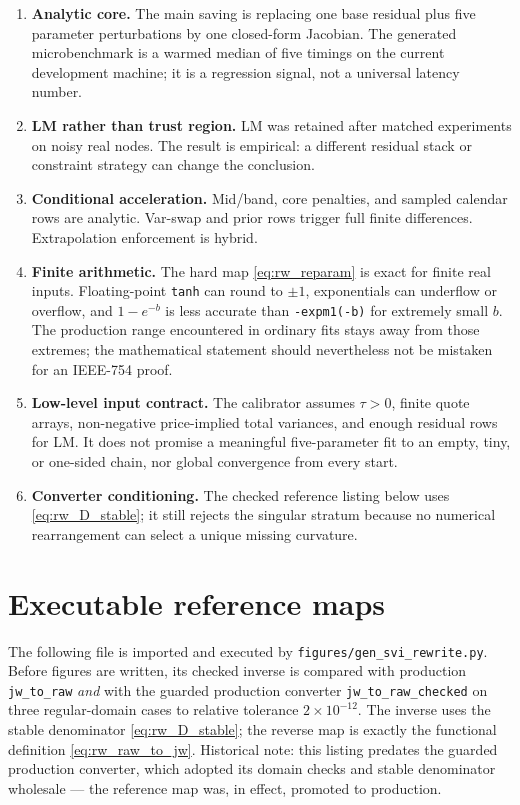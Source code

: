 \documentclass[11pt]{article}
\begin{document}
\begin{enumerate}[leftmargin=1.6em]
\item \textbf{Analytic core.}  The main saving is replacing one base residual
plus five parameter perturbations by one closed-form Jacobian.  The generated
microbenchmark is a warmed median of five timings on the current development
machine; it is a regression signal, not a universal latency number.
\item \textbf{LM rather than trust region.}  LM was retained after matched
experiments on noisy real nodes.  The result is empirical: a different residual
stack or constraint strategy can change the conclusion.
\item \textbf{Conditional acceleration.}  Mid/band, core penalties, and sampled
calendar rows are analytic.  Var-swap and prior rows trigger full finite
differences.  Extrapolation enforcement is hybrid.
\item \textbf{Finite arithmetic.}  The hard map
\eqref{eq:rw_reparam} is exact for finite real inputs.  Floating-point
\texttt{tanh} can round to $\pm1$, exponentials can underflow or overflow, and
$1-e^{-b}$ is less accurate than \texttt{-expm1(-b)} for extremely small $b$.
The production range encountered in ordinary fits stays away from those
extremes; the mathematical statement should nevertheless not be mistaken for
an IEEE-754 proof.
\item \textbf{Low-level input contract.}  The calibrator assumes $\tau>0$,
finite quote arrays, non-negative price-implied total variances, and enough
residual rows for LM.  It does not promise a meaningful five-parameter fit to
an empty, tiny, or one-sided chain, nor global convergence from every start.
\item \textbf{Converter conditioning.}  The checked reference listing below
uses \eqref{eq:rw_D_stable}; it still rejects the singular stratum because no
numerical rearrangement can select a unique missing curvature.
\end{enumerate}

\section{Executable reference maps}
\label{app:rw_reference}

The following file is imported and executed by
\texttt{figures/gen\_svi\_rewrite.py}.  Before figures are written, its checked
inverse is compared with production \texttt{jw\_to\_raw} \emph{and} with the
guarded production converter \texttt{jw\_to\_raw\_checked} on three
regular-domain cases to relative tolerance $2\times10^{-12}$.  The inverse uses
the stable denominator \eqref{eq:rw_D_stable}; the reverse map is exactly the
functional definition \eqref{eq:rw_raw_to_jw}.  Historical note: this listing
predates the guarded production converter, which adopted its domain checks and
stable denominator wholesale --- the reference map was, in effect, promoted to
production.
\end{document}
